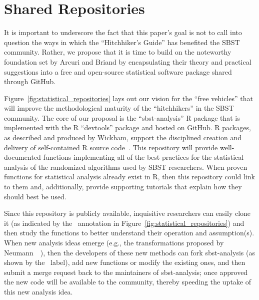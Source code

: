 
\vspace*{-.5em}

\section{Shared Repositories}
\label{sec:repositories}




It is important to underscore the fact that this paper's goal is not to call into question the ways in which the
``Hitchhiker's Guide'' has benefited the SBST community. Rather, we propose that it is time to build on the noteworthy
foundation set by Arcuri and Briand by encapsulating their theory and practical suggestions into a free and open-source
statistical software package shared through GitHub.

Figure~\ref{fig:statistical_repositories} lays out our vision for the ``free vehicles'' that will improve the
methodological maturity of the ``hitchhikers'' in the SBST community. The core of our proposal is the ``sbst-analysis''
R package that is implemented with the R ``devtools'' package and hosted on GitHub. R packages, as described and
produced by Wickham, support the disciplined creation and delivery of self-contained R source code~\cite{Wickham2015}.
This repository will provide well-documented functions implementing all of the best practices for the statistical
analysis of the randomized algorithms used by SBST researchers. When proven functions for statistical analysis already
exist in R, then this repository could link to them and, additionally, provide supporting tutorials that explain how
they should best be used.

Since this repository is publicly available, inquisitive researchers can easily clone it (as indicated by the
\codecopygit~annotation in Figure~\ref{fig:statistical_repositories}) and then study the functions to better understand
their operation and assumption(s). When new analysis ideas emerge (e.g., the transformations proposed by
Neumann~\etal~\cite{Neumann2015}), then the developers of these new methods can fork sbst-analysis (as shown by the
\codeforkgit~label), add new functions or modify the existing ones, and then submit a merge request back to the
maintainers of sbst-analysis; once approved the new code will be available to the community, thereby speeding the uptake
of this new analysis idea.

